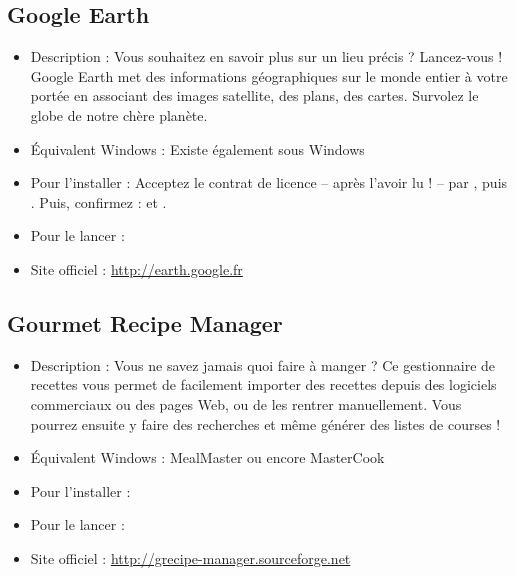 \subsection{Google Earth}
\begin{itemize}
\begingroup
{}
\item Description : Vous souhaitez en savoir plus sur un lieu précis ? Lancez-vous ! Google Earth met des informations géographiques sur le monde entier à votre portée en associant des images satellite, des plans, des cartes. Survolez le globe de notre chère planète.{\par}
\endgroup
\item Équivalent Windows : Existe également sous Windows{\par}
\item Pour l'installer :  Acceptez le contrat de licence -- après l'avoir lu ! -- par , puis . Puis, confirmez : \Touche{$\leftarrow$} et .{\par}
\item Pour le lancer : 
\item Site officiel : \url{http://earth.google.fr}{\par}
\end{itemize}

\subsection{Gourmet Recipe Manager}
\begin{itemize}
\begingroup
{}
\item Description : Vous ne savez jamais quoi faire à manger ? Ce gestionnaire de recettes vous permet de facilement importer des recettes depuis des logiciels commerciaux ou des pages Web, ou de les rentrer manuellement. Vous pourrez ensuite y faire des recherches et même générer des listes de courses !{\par}
\endgroup
\item Équivalent Windows : MealMaster ou encore MasterCook{\par}
\item Pour l'installer : 
\item Pour le lancer : 
\item Site officiel : \url{http://grecipe-manager.sourceforge.net}{\par}
\end{itemize}
